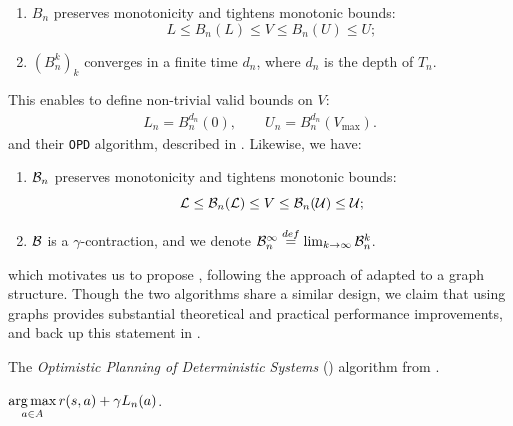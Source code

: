 \documentclass[runningheads]{llncs}
\begin{document}
\begin{lemma}[Properties of $B_n$]
	\begin{enumerate}[label=(\roman*)]
		\item $B_n$ preserves monotonicity and tightens monotonic bounds: $$
		L \leq B_n(L) \leq V \leq B_n(U) \leq U;
		$$
		\item $(B_n^k)_k$ converges in a finite time $d_n$, where $d_n$ is the depth of $T_n$. 
	\end{enumerate}
\end{lemma}
This enables \citet{Hren2008optimistic} to define non-trivial valid bounds on $V$:
\begin{align}
L_n = B_n^{d_n}(0), \qquad U_n = B_n^{d_n}(V_{\max}).
\end{align}
and their \texttt{OPD} algorithm, described in . Likewise, we have:
\begin{lemma}[Properties of $\cB_n$]
	\label{prop:bellman-graph}
	\begin{enumerate}[label=(\roman*)]
		\item $\cB_n$ preserves monotonicity and tightens monotonic bounds: $$
		\mathcal{L} \leq \mathcal{B}_n(\mathcal{L}) \leq V \leq \mathcal{B}_n(\mathcal{U}) \leq \mathcal{U};
		$$
		\item $\mathcal{B}$ is a $\gamma$-contraction, and we denote $\mathcal{B}_n^{\infty} \stackrel{def}{=} \lim_{k\rightarrow \infty} \mathcal{B}_n^k$.
	\end{enumerate}
\end{lemma}
which motivates us to propose , following the approach of  adapted to a graph structure. Though the two algorithms share a similar design, we claim that using graphs provides substantial theoretical and practical performance improvements, and back up this statement in .

\begin{algorithm}[th]
	\caption{The \emph{Optimistic Planning of Deterministic Systems} (\OPD) algorithm from \citep{Hren2008optimistic}.}
	\label{alg:opd}
	\DontPrintSemicolon
	\Return $\displaystyle\operatorname*{arg\,max}_{a\in A} r(s, a) + \gamma L_n(a)$. \;
\end{algorithm}
\end{document}

